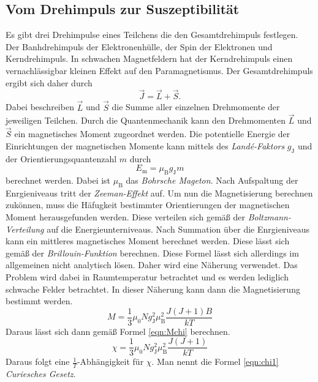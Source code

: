 \subsection{Vom Drehimpuls zur Suszeptibilität}
\label{subsec:drehsus}
Es gibt drei Drehimpulse eines Teilchens die den Gesamtdrehimpuls festlegen. Der Banhdrehimpuls der Elektronenhülle, der Spin der Elektronen und Kerndrehimpuls. In schwachen 
Magnetfeldern hat der Kerndrehimpuls einen vernachlässigbar kleinen Effekt auf den Paramagnetismus. Der Gesamtdrehimpuls ergibt sich daher durch 
\begin{equation*}
    \vec{J} = \vec{L} + \vec{S}.
\end{equation*}
Dabei beschreiben $\vec{L}$ und $\vec{S}$ die Summe aller einzelnen Drehmomente der jeweiligen Teilchen. Durch die Quantenmechanik kann den Drehmomenten $\vec{L}$ und $\vec{S}$
ein magnetisches Moment zugeordnet werden. 
Die potentielle Energie der Einrichtungen der magnetischen Momente kann mittels des \textit{Landé-Faktors} $g_{\text{J}}$ und der Orientierungsquantenzahl $m$ durch 
\begin{equation}
    E_{\text{m}} = \mu_{\text{B}} g_{\text{J}} m
\end{equation} 
berechnet werden. Dabei ist $\mu_{\text{B}}$ das \textit{Bohrsche Mageton}. Nach Aufspaltung der Enrgieniveaus tritt der \textit{Zeeman-Effekt} auf. Um nun die Magnetisierung
berechnen zukönnen, muss die Häfugkeit bestimmter Orientierungen der magnetischen Moment herausgefunden werden. Diese verteilen sich gemäß der \textit{Boltzmann-Verteilung}
auf die  Energieunterniveaus. Nach Summation über die Enrgieniveaus kann ein mittleres magnetisches Moment berechnet werden. Diese lässt sich gemäß der \textit{Brillouin-Funktion}
berechnen. Diese Formel lässt sich allerdings im allgemeinen nicht analytisch lösen. Daher wird eine Näherung verwendet. Das Problem wird dabei in Raumtemperatur betrachtet und
es werden lediglich schwache Felder betrachtet. In dieser Näherung kann dann die Magnetisierung bestimmt werden.
\begin{equation*}
    M = \frac{1}{3}\mu_0 N g^2_{\text{J}} \mu^2_{\text{B}} \frac{J(J+1)B}{kT}
\end{equation*}
Daraus lässt sich dann gemäß Formel \eqref{eqn:Mchi} berechnen. 
\begin{equation}
    \label{eqn:chi1}
    \chi = \frac{1}{3}\mu_0 N g^2_{\text{J}} \mu^2_{\text{B}} \frac{J(J+1)}{kT}
\end{equation}   
Daraus folgt eine $\frac{1}{T}$-Abhängigkeit für $\chi$. Man nennt die Formel \eqref{eqn:chi1} \textit{Curiesches Gesetz}.

